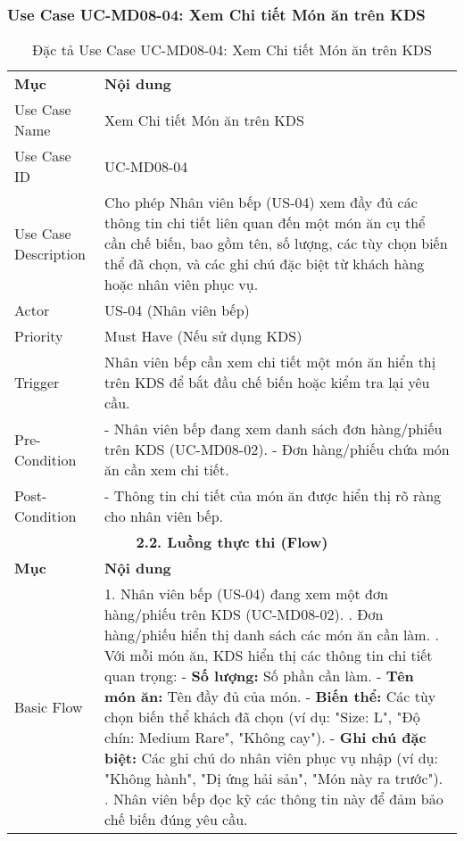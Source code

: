 \subsubsection{Use Case UC-MD08-04: Xem Chi tiết Món ăn trên KDS}

\begin{longtable}{|m{4cm}|p{11cm}|}
\caption{Đặc tả Use Case UC-MD08-04: Xem Chi tiết Món ăn trên KDS} \label{tab:uc_md08_04} \\
\hline

\endhead %
\hline
\endfoot %
\hline
\endlastfoot %
\multicolumn{2}{|c|}{\textbf{2.1. Tóm tắt (Summary)}} \\
\hline
\textbf{Mục} & \textbf{Nội dung} \\
\hline
Use Case Name & Xem Chi tiết Món ăn trên KDS \\
\hline
Use Case ID & UC-MD08-04 \\
\hline
Use Case Description & Cho phép Nhân viên bếp (US-04) xem đầy đủ các thông tin chi tiết liên quan đến một món ăn cụ thể cần chế biến, bao gồm tên, số lượng, các tùy chọn biến thể đã chọn, và các ghi chú đặc biệt từ khách hàng hoặc nhân viên phục vụ. \\
\hline
Actor & US-04 (Nhân viên bếp) \\
\hline
Priority & Must Have (Nếu sử dụng KDS) \\
\hline
Trigger & Nhân viên bếp cần xem chi tiết một món ăn hiển thị trên KDS để bắt đầu chế biến hoặc kiểm tra lại yêu cầu. \\
\hline
Pre-Condition & - Nhân viên bếp đang xem danh sách đơn hàng/phiếu trên KDS (UC-MD08-02). \newline - Đơn hàng/phiếu chứa món ăn cần xem chi tiết. \\
\hline
Post-Condition & - Thông tin chi tiết của món ăn được hiển thị rõ ràng cho nhân viên bếp. \\
\hline
\multicolumn{2}{|c|}{\textbf{2.2. Luồng thực thi (Flow)}} \\
\hline
\textbf{Mục} & \textbf{Nội dung} \\
\hline
Basic Flow & 1. Nhân viên bếp (US-04) đang xem một đơn hàng/phiếu trên KDS (UC-MD08-02). \newline 2. Đơn hàng/phiếu hiển thị danh sách các món ăn cần làm. \newline 3. Với mỗi món ăn, KDS hiển thị các thông tin chi tiết quan trọng: \newline    - \textbf{Số lượng:} Số phần cần làm. \newline    - \textbf{Tên món ăn:} Tên đầy đủ của món. \newline    - \textbf{Biến thể:} Các tùy chọn biến thể khách đã chọn (ví dụ: "Size: L", "Độ chín: Medium Rare", "Không cay"). \newline    - \textbf{Ghi chú đặc biệt:} Các ghi chú do nhân viên phục vụ nhập (ví dụ: "Không hành", "Dị ứng hải sản", "Món này ra trước"). \newline 4. Nhân viên bếp đọc kỹ các thông tin này để đảm bảo chế biến đúng yêu cầu. \\

\end{longtable}
